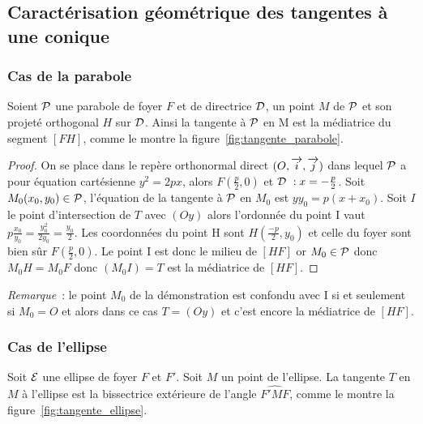 \subsection{Caractérisation géométrique des tangentes à une conique}

\subsubsection{Cas de la parabole}

\begin{prop}
  Soient \(\P\) une parabole de foyer \(F\) et de directrice \(\Dr\), un 
  point \(M\) de \(\P\) et son projeté orthogonal \(H\) sur \(\Dr\). 
  Ainsi la tangente à \(\P\) en M est la médiatrice du segment \([FH]\), 
  comme le montre la figure~\ref{fig:tangente_parabole}.
\end{prop}

\begin{proof}
  On se place dans le repère orthonormal direct \(\rond\) dans lequel 
  \(\P\) a pour équation cartésienne \(y^2 = 2px\), alors 
  \(F\left(\frac{p}{2},0\right)\) et \(\Dr{}~: x = -\frac{p}{2}\). Soit 
  \(M_0(x_0, y_0)\in\P\), l'équation de la tangente à \(\P\) en \(M_0\) 
  est \(yy_0 = p(x + x_0)\). Soit \(I\) le point d'intersection de \(T\) 
  avec \((Oy)\) alors l'ordonnée du point I vaut 
  \(p\frac{x_0}{y_0} = \frac{y_0^2}{2y_0} = \frac{y_0}{2}\). Les coordonnées 
  du point H sont \(H\left(\frac{-p}{2}, y_0\right)\) et celle du foyer 
  sont bien sûr \(F\left(\frac{p}{2},0\right)\). Le point I est donc le 
  milieu de \([HF]\) or \(M_0\in\P\) donc \(M_0H = M_0F\) donc 
  \((M_0I) = T\) est la médiatrice de \([HF]\).
\end{proof}

\emph{Remarque}~: le point \(M_0\) de la démonstration est confondu avec 
I si et seulement si \(M_0 = O\) et alors dans ce cas \(T = (Oy)\) et c'est 
encore la médiatrice de \([HF]\).

\subsubsection{Cas de l'ellipse}

\begin{prop}
  Soit \(\Ell\) une ellipse de foyer \(F\) et \(F'\). Soit \(M\) un 
  point de l'ellipse. La tangente \(T\) en \(M\) à l'ellipse est la 
  bissectrice extérieure de l'angle \(\widehat{F'MF}\), comme le montre 
  la figure~\ref{fig:tangente_ellipse}.
\end{prop}

